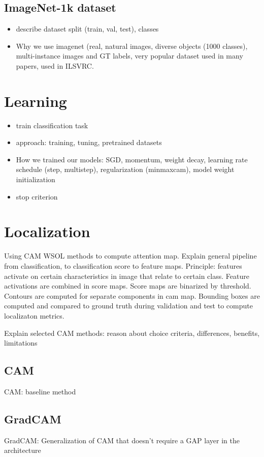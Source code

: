 \subsection{ImageNet-1k dataset}
\begin{itemize}
    \item describe dataset split (train, val, test), classes
    \item Why we use imagenet (real, natural images, diverse objects (1000 classes), multi-instance images and GT labels, very popular dataset used in many papers, used in ILSVRC.
\end{itemize}

\section{Learning}
\begin{itemize}
    \item train classification task
    \item approach: training, tuning, pretrained datasets
    \item How we trained our models: SGD, momentum, weight decay, learning rate schedule (step, multistep), regularization (minmaxcam), model weight initialization
    \item stop criterion
\end{itemize}

\section{Localization}
Using CAM WSOL methods to compute attention map. Explain general pipeline from classification, to classification score to feature maps. Principle: features activate on certain characteristics in image that relate to certain class. Feature activations are combined in score maps. Score maps are binarized by threshold. Contours are computed for separate components in cam map. Bounding boxes are computed and compared to ground truth during validation and test to compute localizaton metrics.

Explain selected CAM methods: reason about choice criteria, differences, benefits, limitations

\subsection{CAM}
CAM: baseline method

\subsection{GradCAM}
GradCAM: Generalization of CAM that doesn’t require a GAP layer in the architecture

